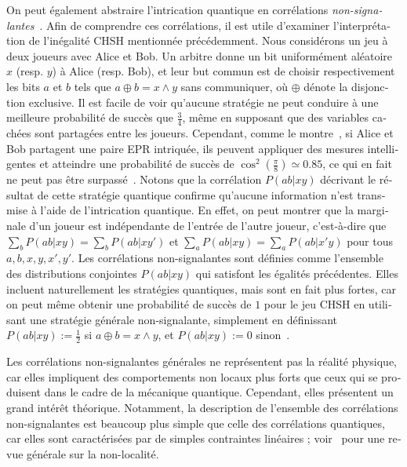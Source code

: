 \begin{otherlanguage}{french}
On peut également abstraire l'intrication quantique en corrélations \emph{non-signalantes}~\cite{Tsirelson80,PR94}. Afin de comprendre ces corrélations, il est utile d'examiner l'interprétation de l'inégalité CHSH mentionnée précédemment. Nous considérons un jeu à deux joueurs avec Alice et Bob. Un arbitre donne un bit uniformément aléatoire $x$ (resp. $y$) à Alice (resp. Bob), et leur but commun est de choisir respectivement les bits $a$ et $b$ tels que $a \oplus b = x \land y$ sans communiquer, où $\oplus$ dénote la disjonction exclusive. Il est facile de voir qu'aucune stratégie ne peut conduire à une meilleure probabilité de succès que $\frac{3}{4}$, même en supposant que des variables cachées sont partagées entre les joueurs. Cependant, comme le montre~\cite{CHSH69}, si Alice et Bob partagent une paire EPR intriquée, ils peuvent appliquer des mesures intelligentes et atteindre une probabilité de succès de $\cos^2\left(\frac{\pi}{8}\right) \simeq 0.85$, ce qui en fait ne peut pas être surpassé~\cite{Tsirelson80}. Notons que la corrélation $P(ab|xy)$ décrivant le résultat de cette stratégie quantique confirme qu'aucune information n'est transmise à l'aide de l'intrication quantique. En effet, on peut montrer que la marginale d'un joueur est indépendante de l'entrée de l'autre joueur, c'est-à-dire que $\sum_bP(ab|xy)=\sum_bP(ab|xy')$ et $\sum_aP(ab|xy)=\sum_aP(ab|x'y)$ pour tous $a,b,x,y,x',y'$. Les corrélations non-signalantes sont définies comme l'ensemble des distributions conjointes $P(ab|xy)$ qui satisfont les égalités précédentes. Elles incluent naturellement les stratégies quantiques, mais sont en fait plus fortes, car on peut même obtenir une probabilité de succès de $1$ pour le jeu CHSH en utilisant une stratégie générale non-signalante, simplement en définissant $P(ab|xy):=\frac{1}{2}$ si $a \oplus b = x \land y$, et $P(ab|xy):=0$ sinon~\cite{PR94}.

Les corrélations non-signalantes générales ne représentent pas la réalité physique, car elles impliquent des comportements non locaux plus forts que ceux qui se produisent dans le cadre de la mécanique quantique. Cependant, elles présentent un grand intérêt théorique. Notamment, la description de l'ensemble des corrélations non-signalantes est beaucoup plus simple que celle des corrélations quantiques, car elles sont caractérisées par de simples contraintes linéaires ; voir~\cite{BCPSW14} pour une revue générale sur la non-localité.


\end{otherlanguage}

